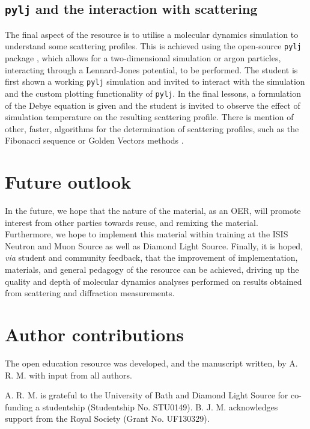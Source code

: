 \documentclass[amsmath,amssymb,twocolumn,superscriptaddress]{revtex4-1}
\begin{document}
\subsection{\texttt{pylj} and the interaction with scattering}

The final aspect of the resource is to utilise a molecular dynamics simulation to understand some scattering profiles.
This is achieved using the open-source \texttt{pylj} package \cite{mccluskey_pylj_2018}, which allows for a two-dimensional simulation or argon particles, interacting through a Lennard-Jones potential, to be performed.
The student is first shown a working \texttt{pylj} simulation and invited to interact with the simulation and the custom plotting functionality of \texttt{pylj}.
In the final lessons, a formulation of the Debye equation \cite{debye_zerstreuung_1915} is given and the student is invited to observe the effect of simulation temperature on the resulting scattering profile.
There is mention of other, faster, algorithms for the determination of scattering profiles, such as the Fibonacci sequence or Golden Vectors methods \cite{svergun_solution_1994,watson_rapid_2013}.

\section{Future outlook}

In the future, we hope that the nature of the material, as an OER, will promote interest from other parties towards reuse, and remixing the material.
Furthermore, we hope to implement this material within training at the ISIS Neutron and Muon Source as well as Diamond Light Source.
Finally, it is hoped, \textit{via} student and community feedback, that the improvement of implementation, materials, and general pedagogy of the resource can be achieved, driving up the quality and depth of molecular dynamics analyses performed on results obtained from scattering and diffraction measurements.

\section{Author contributions}

The open education resource was developed, and the manuscript written, by A. R. M. with input from all authors.

\begin{acknowledgements}
A. R. M. is grateful to the University of Bath and Diamond Light Source for co-funding a studentship (Studentship No. STU0149).
B. J. M. acknowledges support from the Royal Society (Grant No. UF130329).
\end{acknowledgements}


\end{document}
